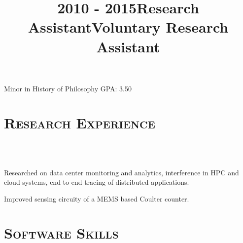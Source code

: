 \begin{resume}
	\title{2010 - 2015}
	\begin{position} 
		Minor in History of Philosophy \hfill GPA: 3.50 \hspace{-2.5mm}
	\end{position}
	
	
	
	\section{\textsc{Research Experience}}
	
	\begin{formatb}
		\\
		\body\\
	\end{formatb}
	
	\title{Research Assistant}
	\begin{position}
		Researched on data center monitoring and analytics, interference in HPC and
    cloud systems, end-to-end tracing of distributed applications.
	\end{position}
	
	\title{Voluntary Research Assistant}
	\begin{position}
		Improved sensing circuity of a MEMS based Coulter counter. 
	\end{position}
	
	\section{\textsc{Software Skills}}
	

\end{resume}
